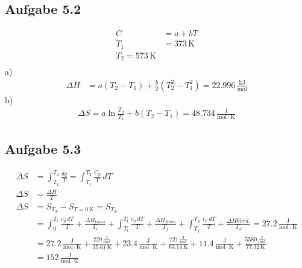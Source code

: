 \documentclass{article}
\begin{document}
\subsection*{Aufgabe 5.2}
\begin{align*}
    C &= a+bT\\
    T_1 &= 373\,\mathrm{K}\\
    T_2 = 573\,\mathrm{K}\\
\end{align*}
a)
\begin{align*}
    \Delta H &= a(T_2-T_1)+\frac{b}{2}(T_2^2-T_1^2) = 22.996\,\mathrm{\frac{kJ}{mol}}
\end{align*}
b)
\begin{align*}
    \Delta S = a \ln\frac{T_2}{T_1} + b(T_2-T_1) = 48.734\,\mathrm{\frac{J}{mol\cdot K}}
\end{align*}

\subsection*{Aufgabe 5.3}
\begin{align*}
    \Delta S &= \int_{T_1}^{T_2} \frac{\delta q}{T} = \int_{T_1}^{T_2} \frac{C_p}{T}\,dT\\
    \Delta S &= \frac{\Delta H}{T}\\
    \Delta S &= S_{T_S} - S_{T=0\,\mathrm{K}} = S_{T_S}\\
    &= \int_{0}^{T_t} \frac{c_p\,dT}{T}+\frac{\Delta H_{trans}}{T_t} + \int_{T_t}^{T_t}\frac{c_p\,dT}{T}+\frac{\Delta H_{Schm}}{T_f} + \int_{T_f}^{T_S} \frac{c_p\,dT}{T}+\frac{\Delta H{Verd.}}{T_S} = 27.2\,\mathrm{\frac{J}{mol\cdot K}}\\
    &= 27.2\,\mathrm{\frac{J}{mol\cdot K}}+\frac{229\,\mathrm{\frac{J}{mol}}}{35.61\,\mathrm{K}}+23.4\,\mathrm{\frac{J}{mol\cdot K}}+\frac{721\,\mathrm{\frac{J}{mol}}}{63.14\,\mathrm{K}}+11.4\,\mathrm{\frac{J}{mol\cdot K}}+\frac{5580\,\mathrm{\frac{J}{mol}}}{77.32\,\mathrm{K}}\\
    &= 152\,\mathrm{\frac{J}{mol\cdot K}}
\end{align*}
\end{document}
